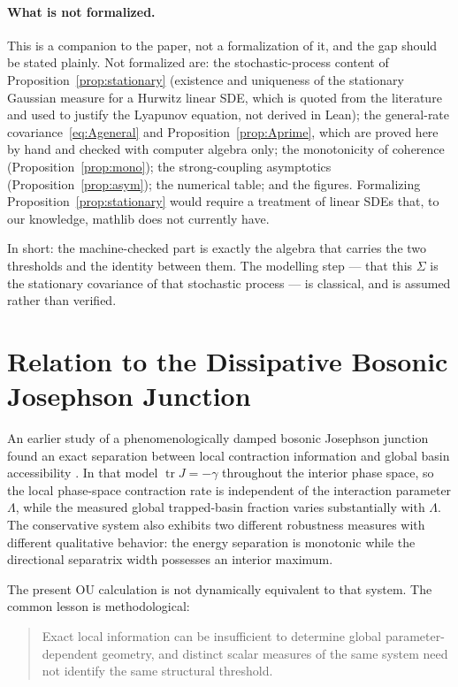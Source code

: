 \documentclass[11pt]{article}
\theoremstyle{plain}
\theoremstyle{remark}
\newcommand{\tr}{\operatorname{tr}}
\begin{document}
\paragraph{What is not formalized.} This is a companion to the paper, not a formalization of
it, and the gap should be stated plainly. Not formalized are: the stochastic-process content of
Proposition~\ref{prop:stationary} (existence and uniqueness of the stationary Gaussian measure
for a Hurwitz linear SDE, which is quoted from the literature and used to justify the Lyapunov
equation, not derived in Lean); the general-rate covariance~\eqref{eq:Ageneral} and
Proposition~\ref{prop:Aprime}, which are proved here by hand and checked with computer algebra
only; the monotonicity of coherence (Proposition~\ref{prop:mono}); the strong-coupling
asymptotics (Proposition~\ref{prop:asym}); the numerical table; and the figures. Formalizing
Proposition~\ref{prop:stationary} would require a treatment of linear SDEs that, to our
knowledge, mathlib does not currently have.

In short: the machine-checked part is exactly the algebra that carries the two thresholds and
the identity between them. The modelling step --- that this $\Sigma$ is the stationary
covariance of that stochastic process --- is classical, and is assumed rather than verified.

\section{Relation to the Dissipative Bosonic Josephson Junction}

An earlier study of a phenomenologically damped bosonic Josephson junction found an exact
separation between local contraction information and global basin accessibility
\cite{DeJesus2026bjj}. In that model $\tr J=-\gamma$ throughout the interior phase space, so the
local phase-space contraction rate is independent of the interaction parameter $\Lambda$, while
the measured global trapped-basin fraction varies substantially with $\Lambda$. The
conservative system also exhibits two different robustness measures with different qualitative
behavior: the energy separation is monotonic while the directional separatrix width possesses
an interior maximum.

The present OU calculation is not dynamically equivalent to that system. The common lesson is
methodological:
\begin{quote}
Exact local information can be insufficient to determine global parameter-dependent geometry,
and distinct scalar measures of the same system need not identify the same structural
threshold.
\end{quote}
\end{document}
